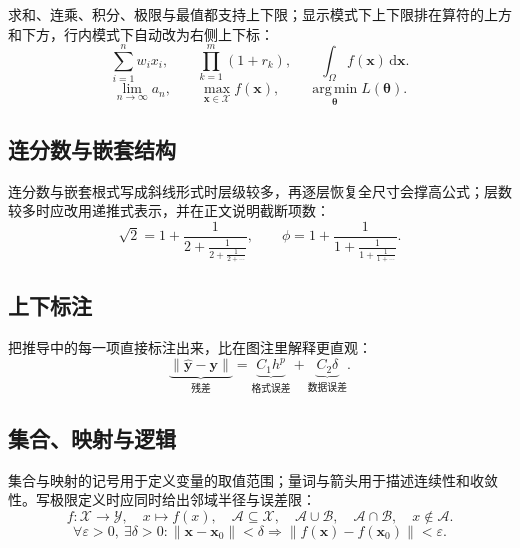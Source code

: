 求和、连乘、积分、极限与最值都支持上下限；显示模式下上下限排在算符的上方和下方，行内模式下自动改为右侧上下标：
\begin{equation}
  \sum_{i=1}^{n}w_ix_i,\qquad
  \prod_{k=1}^{m}(1+r_k),\qquad
  \int_{\Omega}f(\bm{x})\,\mathrm{d}\bm{x}.
  \label{eq:big-operators}
\end{equation}
\begin{equation}
  \lim_{n\to\infty}a_n,\qquad
  \max_{\bm{x}\in\mathcal{X}}f(\bm{x}),\qquad
  \operatorname*{arg\,min}_{\bm{\theta}}L(\bm{\theta}).
  \label{eq:limits-extrema}
\end{equation}

\subsection{连分数与嵌套结构}

连分数与嵌套根式写成斜线形式时层级较多，再逐层恢复全尺寸会撑高公式；层数较多时应改用递推式表示，并在正文说明截断项数：
\begin{equation}
  \sqrt{2}=1+\frac{1}{2+\frac{1}{2+\frac{1}{2+\cdots}}},\qquad
  \phi=1+\frac{1}{1+\frac{1}{1+\frac{1}{1+\cdots}}}.
  \label{eq:continued-fraction}
\end{equation}

\subsection{上下标注}

把推导中的每一项直接标注出来，比在图注里解释更直观：
\begin{equation}
  \underbrace{\|\hat{\bm{y}}-\bm{y}\|}_{\text{残差}}
  =\underbrace{C_1h^p}_{\text{格式误差}}
  +\underbrace{C_2\delta}_{\text{数据误差}}.
  \label{eq:annotated-sum}
\end{equation}

\subsection{集合、映射与逻辑}

集合与映射的记号用于定义变量的取值范围；量词与箭头用于描述连续性和收敛性。写极限定义时应同时给出邻域半径与误差限：
\begin{equation}
  f:\mathcal{X}\to\mathcal{Y},\quad x\mapsto f(x),\quad
  \mathcal{A}\subseteq\mathcal{X},\quad
  \mathcal{A}\cup\mathcal{B},\quad
  \mathcal{A}\cap\mathcal{B},\quad x\notin\mathcal{A}.
  \label{eq:set-mapping}
\end{equation}
\begin{equation}
  \forall\varepsilon>0,\ \exists\delta>0:
  \|\bm{x}-\bm{x}_0\|<\delta
  \Rightarrow
  \|f(\bm{x})-f(\bm{x}_0)\|<\varepsilon.
  \label{eq:continuity}
\end{equation}

